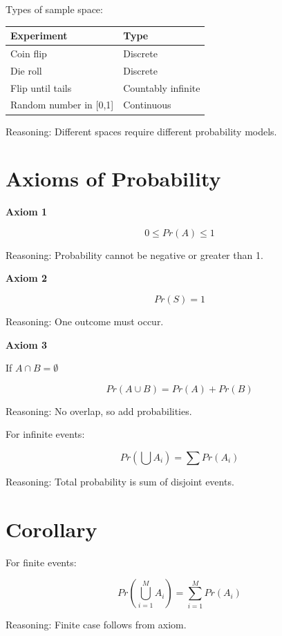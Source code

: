 \documentclass[12pt]{article}
\begin{document}
\bigskip

Types of sample space:

\begin{center}
\begin{tabular}{ll}
\toprule
Experiment & Type \\
\midrule
Coin flip & Discrete \\
Die roll & Discrete \\
Flip until tails & Countably infinite \\
Random number in [0,1] & Continuous \\
\bottomrule
\end{tabular}
\end{center}

Reasoning: Different spaces require different probability models.

\section{Axioms of Probability}

\textbf{Axiom 1}

\[
0 \le Pr(A) \le 1
\]

Reasoning: Probability cannot be negative or greater than 1.

\bigskip

\textbf{Axiom 2}

\[
Pr(S) = 1
\]

Reasoning: One outcome must occur.

\bigskip

\textbf{Axiom 3}

If $A \cap B = \emptyset$

\[
Pr(A \cup B) = Pr(A) + Pr(B)
\]

Reasoning: No overlap, so add probabilities.

\bigskip

For infinite events:

\[
Pr\left(\bigcup A_i\right) = \sum Pr(A_i)
\]

Reasoning: Total probability is sum of disjoint events.

\section{Corollary}

For finite events:

\[
Pr\left(\bigcup_{i=1}^{M} A_i\right)
=
\sum_{i=1}^{M} Pr(A_i)
\]

Reasoning: Finite case follows from axiom.
\end{document}
